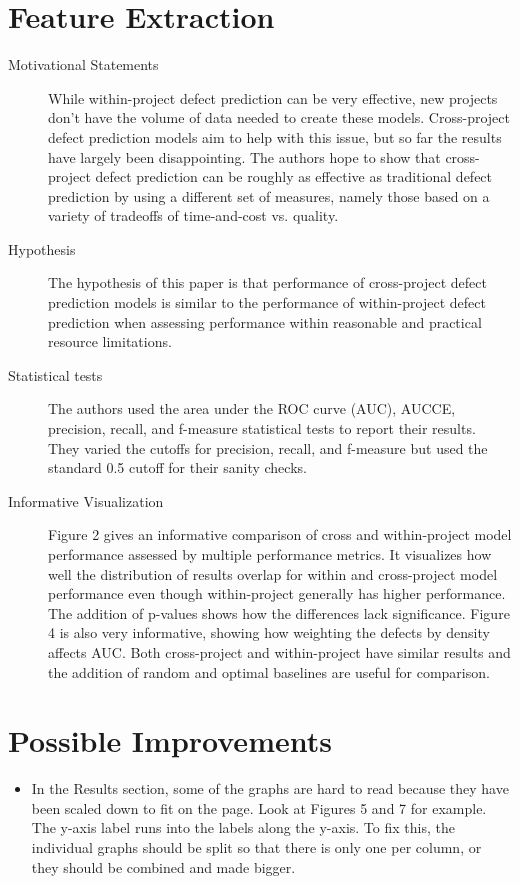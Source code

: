 \documentclass[english]{article}
\begin{document}
\section*{Feature Extraction}
\begin{description}
\item[{Motivational Statements}]  While within-project defect prediction can be very effective, new projects don't have the volume of data needed to create these models. Cross-project defect prediction models aim to help with this issue, but so far the results have largely been disappointing. The authors hope to show that cross-project defect prediction can be roughly as effective as traditional defect prediction by using a different set of measures, namely those based on a variety of tradeoffs of time-and-cost vs. quality.
\item[{Hypothesis}] The hypothesis of this paper is that performance of cross-project defect prediction models is similar to the performance of within-project defect prediction when assessing performance within reasonable and practical resource limitations.
\item[{Statistical tests}] The authors used the area under the ROC curve (AUC), AUCCE, precision, recall, and f-measure statistical tests to report their results. They varied the cutoffs for precision, recall, and f-measure but used the standard 0.5 cutoff for their sanity checks.
\item[{Informative Visualization}] Figure 2 gives an informative comparison of cross and within-project model performance assessed by multiple performance metrics. It visualizes how well the distribution of results overlap for within and cross-project model performance even though within-project generally has higher performance. The addition of p-values shows how the differences lack significance. Figure 4 is also very informative, showing how weighting the defects by density affects AUC. Both cross-project and within-project have similar results and the addition of random and optimal baselines are useful for comparison.

\end{description}


\section*{Possible Improvements}
\begin{itemize}
\item In the Results section, some of the graphs are hard to read because they have been scaled down to fit on the page. Look at Figures 5 and 7 for example. The y-axis label runs into the labels along the y-axis. To fix this, the individual graphs should be split so that there is only one per column, or they should be combined and made bigger.
\end{itemize}
\end{document}
